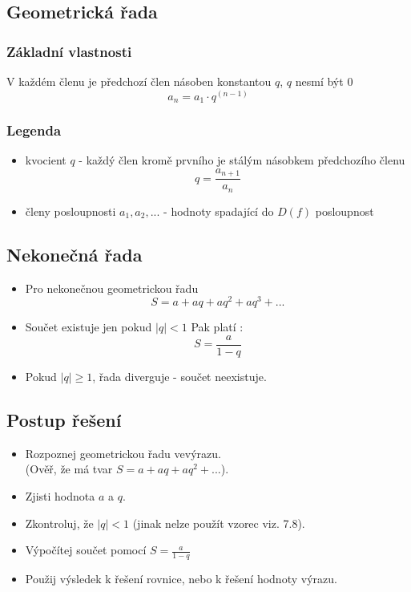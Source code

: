     \subsection{Geometrická řada}
    \subsubsection{Základní vlastnosti}
         V každém členu je předchozí člen násoben konstantou $q$, $q$ nesmí být $0$\\ 
            $$
            a_n=a_1\cdot q^{(n-1)}
            $$
    \subsubsection{Legenda}
            \begin{itemize}
                \item kvocient $q$ - každý člen kromě prvního je stálým násobkem předchozího členu
                $$
                q=\frac{a_{n+1}}{a_n}
                $$
                \item členy posloupnosti $a_1,a_2,...$ - hodnoty spadající do $D(f)$ posloupnost
            \end{itemize}
    \subsection{Nekonečná řada}
        \begin{itemize}
            \item Pro nekonečnou geometrickou řadu
            $$
            S=a+aq+aq^2+aq^3+...
            $$
            \item Součet existuje jen pokud $|q|<1$ Pak platí :
            $$
            S=\frac{a}{1-q}
            $$
            \item Pokud $|q|\geq 1$, řada diverguje - součet neexistuje.
            \end{itemize}
    \subsection{Postup řešení}
        \begin{itemize}
            \item Rozpoznej geometrickou řadu vevýrazu.\\
            (Ověř, že má tvar $S=a+aq+aq^2+...$).
            \item Zjisti hodnota $a$ a $q$.
            \item Zkontroluj, že $|q|<1$ (jinak nelze použít vzorec viz. 7.8).
            \item Výpočítej součet pomocí $S=\frac{a}{1-q}$
            \item Použij výsledek k řešení rovnice, nebo k řešení hodnoty výrazu.
        \end{itemize}
